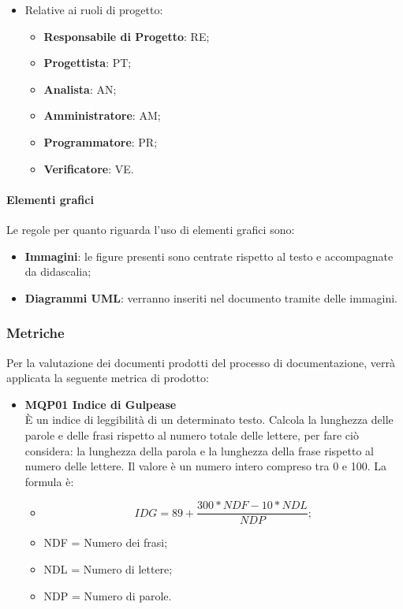 \begin{itemize}
\begin{itemize}
    \item Relative ai ruoli di progetto:        
        
        \begin{itemize}
        \item \textbf{Responsabile di Progetto}: RE;
        \item \textbf{Progettista}: PT;
        \item \textbf{Analista}: AN;
        \item \textbf{Amministratore}: AM;
        \item \textbf{Programmatore}: PR;
        \item \textbf{Verificatore}: VE.
        \end{itemize}
        
    \end{itemize}

\end{itemize}

\paragraph{Elementi grafici}
Le regole per quanto riguarda l’uso di elementi grafici sono:
\begin{itemize}
\item \textbf{Immagini}: le figure presenti sono centrate rispetto al testo e accompagnate da didascalia;
\item \textbf{Diagrammi UML}: verranno inseriti nel documento tramite delle immagini.
\end{itemize}

\subsubsection{Metriche}
Per la valutazione dei documenti prodotti del processo di documentazione, verrà applicata la seguente metrica di prodotto:
\begin{itemize}
\item \textbf{MQP01 Indice di Gulpease} \\
È un indice di leggibilità di un determinato testo. Calcola la lunghezza delle parole e delle frasi rispetto al numero totale delle lettere, per fare ciò considera: la lunghezza della parola e la lunghezza della frase rispetto al numero delle lettere. Il valore è un numero intero compreso tra 0 e 100.
La formula è:
\begin{itemize}
  \item[] \[IDG =  89 + \frac{300 * NDF - 10 * NDL}{NDP};\]
  \item NDF = Numero dei frasi;
  \item NDL = Numero di lettere;
  \item NDP = Numero di parole.
  \end{itemize}
\end{itemize}

